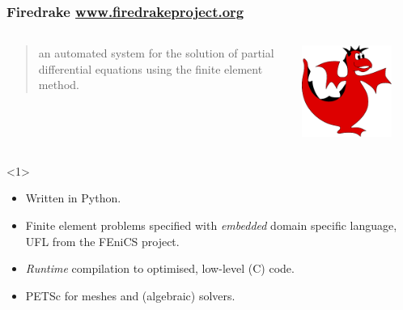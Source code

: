\documentclass[presentation, 10pt]{beamer}
\begin{document}
\begin{frame}
  \frametitle{Firedrake \url{www.firedrakeproject.org}}
  \begin{columns}
    \begin{column}{0.8\textwidth}
      \begin{quote}
        {\normalfont [\ldots]} an automated system for the solution of
        partial differential equations using the finite element
        method.
      \end{quote}
    \end{column}
    \begin{column}{0.2\textwidth}
      \includegraphics[width=0.8\textwidth]{firedrake-small}
    \end{column}
  \end{columns}
  \begin{overlayarea}{\textwidth}{0.8\textheight}
    \begin{onlyenv}<1>
      \begin{itemize}
      \item Written in Python.
      \item Finite element problems specified with \emph{embedded}
        domain specific language, UFL \parencite{Alnaes:2014} from the
        FEniCS project.
      \item \emph{Runtime} compilation to optimised, low-level (C)
        code.
      \item PETSc for meshes and (algebraic) solvers.
      \end{itemize}


\end{onlyenv}
\end{overlayarea}
\end{frame}
\end{document}
